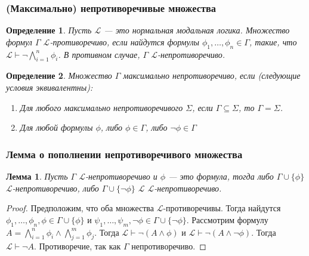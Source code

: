 \documentclass[pdf,utf8,russian,aspectratio=169]{beamer}
\newtheorem{defin}{Определение}
\newtheorem{lem}{Лемма}
\begin{document}
\begin{frame}
  \frametitle{(Максимально) непротиворечивые множества}

  \begin{defin}
    Пусть $\mathcal{L}$ --- это нормальная модальная логика. Множество формул $\Gamma$ $\mathcal{L}$-противоречиво, если найдутся формулы
    $\phi_1, \dots, \phi_n \in \Gamma$, такие, что $\mathcal{L} \vdash \neg \bigwedge \limits_{i = 1}^n \phi_i$. В противном случае,
    $\Gamma$ $\mathcal{L}$-непротиворечиво.
  \end{defin}

  \begin{defin}
    Множество $\Gamma$ максимально непротиворечиво, если (следующие условия эквивалентны):
    \begin{enumerate}
      \item Для любого максимально непротиворечивого $\Sigma$, если $\Gamma \subseteq \Sigma$, то $\Gamma = \Sigma$.
      \item Для любой формулы $\phi$, либо $\phi \in \Gamma$, либо $\neg \phi \in \Gamma$
    \end{enumerate}
  \end{defin}
\end{frame}

\begin{frame}
  \frametitle{Лемма о пополнении непротиворечивого множества}

  \begin{lem}
    Пусть $\Gamma$ $\mathcal{L}$-непротиворечиво и $\phi$ --- это формула, тогда либо $\Gamma \cup \{ \phi \}$ $\mathcal{L}$-непротиворечиво,
    либо $\Gamma \cup \{ \neg \phi \}$ $\mathcal{L}$ $\mathcal{L}$-непротиворечиво.
  \end{lem}

  \begin{proof}
    Предположим, что оба множества $\mathcal{L}$-противоречивы. Тогда найдутся $\phi_1, \dots, \phi_n, \phi \in \Gamma \cup \{ \phi \}$ и
    $\psi_1, \dots, \psi_m, \neg \phi \in \Gamma \cup \{ \neg \phi \}$. Рассмотрим формулу
    $A = \bigwedge \limits_{i = 1}^n \phi_i \land \bigwedge \limits_{j = 1}^m \phi_j$. Тогда $\mathcal{L} \vdash \neg (A \land \phi)$ и
    $\mathcal{L} \vdash \neg (A \land \neg \phi)$. Тогда $\mathcal{L} \vdash \neg A$. Противоречие, так как $\Gamma$ непротиворечиво.
  \end{proof}
\end{frame}
\end{document}

